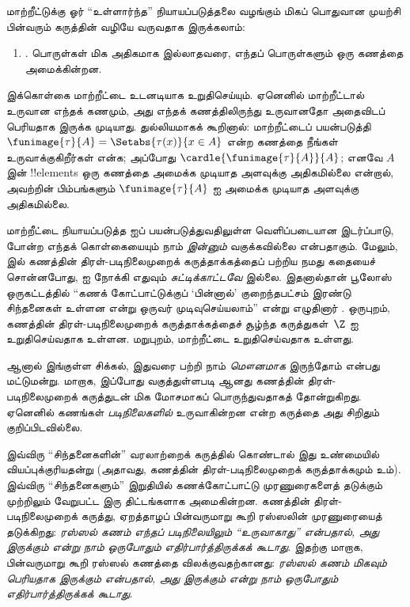 \documentclass[../../../include/open-logic-section]{subfiles}
\begin{document}

மாற்றீட்டுக்கு ஓர் ``உள்ளார்ந்த'' நியாயப்படுத்தலை வழங்கும் மிகப் பொதுவான
முயற்சி பின்வரும் கருத்தின் வழியே வருவதாக இருக்கலாம்:
\begin{enumerate}
	\item[] \limofsize. பொருள்கள் மிக அதிகமாக இல்லாதவரை, எந்தப் பொருள்களும்
	ஒரு கணத்தை அமைக்கின்றன.
\end{enumerate}
இக்கொள்கை மாற்றீட்டை உடனடியாக உறுதிசெய்யும். ஏனெனில் மாற்றீட்டால் உருவான
எந்தக் கணமும், அது எந்தக் கணத்திலிருந்து உருவானதோ அதைவிடப் பெரியதாக இருக்க
முடியாது. துல்லியமாகக் கூறினால்: மாற்றீட்டைப் பயன்படுத்தி
$\funimage{\tau}{A} = \Setabs{\tau(x)}{x \in A}$ என்ற கணத்தை நீங்கள்
உருவாக்குகிறீர்கள் என்க; அப்போது $\cardle{\funimage{\tau}{A}}{A}$; எனவே
$A$ இன் !!{element}s ஒரு கணத்தை அமைக்க முடியாத அளவுக்கு அதிகமில்லை என்றால்,
அவற்றின் பிம்பங்களும் $\funimage{\tau}{A}$ ஐ அமைக்க முடியாத அளவுக்கு
அதிகமில்லை.

மாற்றீட்டை நியாயப்படுத்த \limofsize{} ஐப் பயன்படுத்துவதிலுள்ள வெளிப்படையான
இடர்ப்பாடு, \limofsize{} போன்ற எந்தக் கொள்கையையும் நாம் \emph{இன்னும்}
வகுக்கவில்லை என்பதாகும். மேலும்,
 இல் கணத்தின்
திரள்-படிநிலைமுறைக் கருத்தாக்கத்தைப் பற்றிய நமது கதையைச் சொன்னபோது,
\limofsize{} ஐ நோக்கி எதுவும் \emph{சுட்டிக்காட்டவே} இல்லை. இதனால்தான்
பூலோஸ் ஒருகட்டத்தில் ``கணக் கோட்பாட்டுக்குப் `பின்னால்' குறைந்தபட்சம் இரண்டு
சிந்தனைகள் உள்ளன என்று ஒருவர் முடிவுசெய்யலாம்'' என்று எழுதினார்
\citeyearpar[p.~19]{Boolos1989}. ஒருபுறம், கணத்தின் திரள்-படிநிலைமுறைக்
கருத்தாக்கத்தைச் சூழ்ந்த கருத்துகள்~$\Z$ ஐ உறுதிசெய்வதாக உள்ளன. மறுபுறம்,
\limofsize{} மாற்றீட்டை உறுதிசெய்வதாக உள்ளது.

ஆனால் இங்குள்ள சிக்கல், இதுவரை \limofsize{} பற்றி நாம் \emph{மௌனமாக}
இருந்தோம் என்பது மட்டுமன்று. மாறாக, இப்போது வகுத்துள்ளபடி \limofsize{}
ஆனது கணத்தின் திரள்-படிநிலைமுறைக் கருத்துடன் மிக மோசமாகப் பொருந்துவதாகத்
தோன்றுகிறது. ஏனெனில் கணங்கள் \emph{படிநிலைகளில்} உருவாகின்றன என்ற கருத்தை
அது சிறிதும் குறிப்பிடவில்லை.

இவ்விரு ``சிந்தனைகளின்'' வரலாற்றைக் கருத்தில் கொண்டால் இது உண்மையில்
வியப்புக்குரியதன்று (அதாவது, கணத்தின் திரள்-படிநிலைமுறைக் கருத்தாக்கமும்
\limofsize{} உம்). இவ்விரு ``சிந்தனைகளும்'' இறுதியில் கணக்கோட்பாட்டு
முரணுரைகளைத் தடுக்கும் முற்றிலும் வேறுபட்ட இரு திட்டங்களாக அமைகின்றன.
கணத்தின் திரள்-படிநிலைமுறைக் கருத்து, ஏறத்தாழப் பின்வருமாறு கூறி ரஸ்ஸலின்
முரணுரையைத் தடுக்கிறது: \emph{ரஸ்ஸல் கணம் எந்தப் படிநிலையிலும்
``உருவாகாது'' என்பதால், அது இருக்கும் என்று நாம் ஒருபோதும்
எதிர்பார்த்திருக்கக் கூடாது}. இதற்கு மாறாக, \limofsize{} பின்வருமாறு கூறி
ரஸ்ஸல் கணத்தை விலக்குவதற்கானது: \emph{ரஸ்ஸல் கணம் மிகவும் பெரியதாக
இருக்கும் என்பதால், அது இருக்கும் என்று நாம் ஒருபோதும் எதிர்பார்த்திருக்கக்
கூடாது}.
\end{document}
